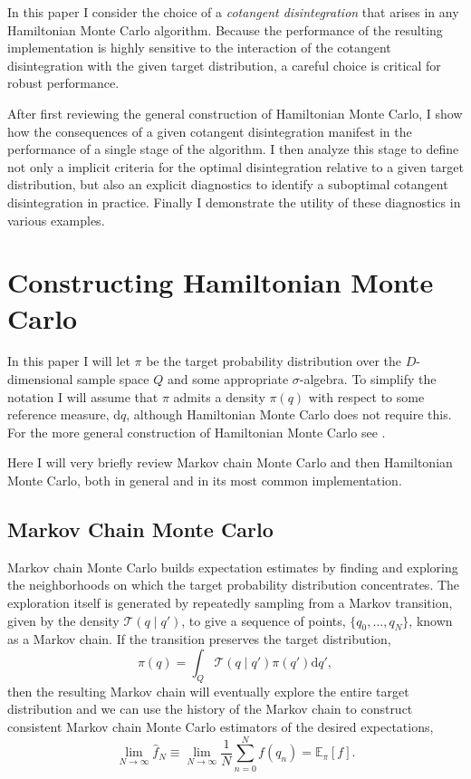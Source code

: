 \documentclass[stslayout]{imsart}
\newcommand\dd{\mathrm{d}}
\begin{document}
In this paper I consider the choice of a \emph{cotangent disintegration} that 
arises in any Hamiltonian Monte Carlo algorithm.  Because the performance of 
the resulting implementation is highly sensitive to the interaction of the cotangent
disintegration with the given target distribution, a careful choice is critical for 
robust performance.

After first reviewing the general construction of Hamiltonian Monte Carlo, I
show how the consequences of a given cotangent disintegration manifest
in the performance of a single stage of the algorithm.  I then analyze this 
stage to define not only a implicit criteria for the optimal disintegration 
relative to a given target distribution, but also an explicit diagnostics to 
identify a suboptimal cotangent disintegration in practice.  Finally I
demonstrate the utility of these diagnostics in various examples.

\section{Constructing Hamiltonian Monte Carlo}

In this paper I will let $\pi$ be the target probability distribution over the 
$D$-dimensional sample space $Q$ and some appropriate $\sigma$-algebra.  
To simplify the notation I will assume that $\pi$ admits a density 
$\pi \! \left( q \right)$ with respect to some reference measure, $\dd q$, 
although Hamiltonian Monte Carlo does not require this.  For the more 
general construction of Hamiltonian Monte Carlo see 
\cite{BetancourtEtAl:2014a}.

Here I will very briefly review Markov chain Monte Carlo and then
Hamiltonian Monte Carlo, both in general and in its most common
implementation.

\subsection{Markov Chain Monte Carlo}

Markov chain Monte Carlo builds expectation estimates by finding and
exploring the neighborhoods on which the target probability distribution
concentrates.  The exploration itself is generated by repeatedly sampling 
from a Markov transition, given by the density 
$\mathcal{T} \! \left( q \mid q' \right)$, to give a sequence of points, 
$\{ q_{0}, \ldots, q_{N} \}$, known as a Markov chain.  If the transition 
preserves the target distribution,
%
\begin{equation*}
\pi \! \left( q \right) = 
\int_{Q} \mathcal{T} \! \left( q \mid q' \right) \pi \! \left( q' \right) \dd q',
\end{equation*}
%
then the resulting Markov chain will eventually explore the entire target 
distribution and we can use the history of the Markov chain to construct
consistent Markov chain Monte Carlo estimators of the desired
expectations,
%
\begin{equation*}
\lim_{N \rightarrow \infty} \hat{f}_{N}
\equiv
\lim_{N \rightarrow \infty} \frac{1}{N} \sum_{n = 0}^{N} f \! \left( q_{n} \right)
= \mathbb{E}_{\pi} \! \left[ f \right].
\end{equation*}
\end{document}
